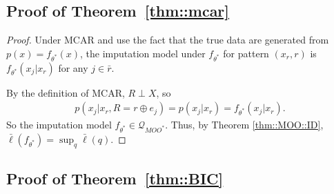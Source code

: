 \documentclass[aos, preprint]{imsart}
\theoremstyle{plain}
\newtheorem{lemma}[theorem]{Lemma}
\theoremstyle{definition}
\newcommand{\E}{\mbox{$\mathbb{E}$}}
\newcommand{\bX}{\mathbf{X}}
\newcommand{\bR}{\mathbf{R}}
\begin{document}
\begin{appendix}
\subsection{Proof of Theorem~\ref{thm::mcar}}
\begin{proof}
Under MCAR and use the fact that the true data are generated from $p(x)=f_{\theta^*}(x)$,
the imputation model under $f_{\theta^*}$ for pattern $(x_r,r)$ is
$f_{\theta^*}(x_{j}|x_r)$
for any $j \in \bar r$.

By the definition of MCAR, $R\perp X$, so 
\begin{align*}
p(x_j|x_r, R= r\oplus e_j)  = p(x_j|x_r)
 = f_{\theta^*}(x_j|x_r).
\end{align*}
So the imputation model $f_{\theta^*}\in\mathcal{Q}_{MOO^*}$.
Thus, by Theorem \ref{thm::MOO::ID}, $\bar \ell(f_{\theta^*}) = \sup_q \bar \ell(q)$.




\end{proof}



\subsection{Proof of Theorem~\ref{thm::BIC}}

%
%
%


\end{appendix}
\end{document}
